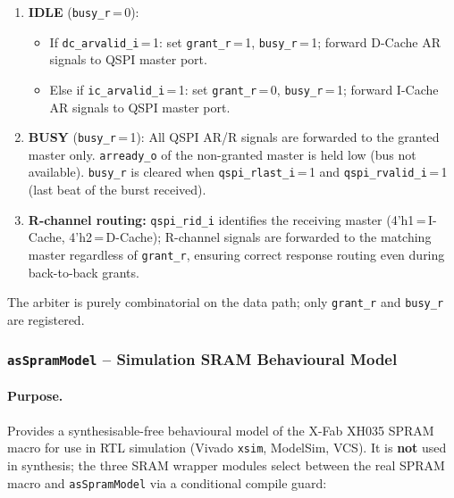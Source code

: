\begin{enumerate}
  \item \textbf{IDLE} (\texttt{busy\_r}\,=\,0):
    \begin{itemize}
      \item If \texttt{dc\_arvalid\_i}\,=\,1:
        set \texttt{grant\_r}\,=\,1, \texttt{busy\_r}\,=\,1;
        forward D-Cache AR signals to QSPI master port.
      \item Else if \texttt{ic\_arvalid\_i}\,=\,1:
        set \texttt{grant\_r}\,=\,0, \texttt{busy\_r}\,=\,1;
        forward I-Cache AR signals to QSPI master port.
    \end{itemize}

  \item \textbf{BUSY} (\texttt{busy\_r}\,=\,1):
    All QSPI AR/R signals are forwarded to the granted master only.
    \texttt{arready\_o} of the non-granted master is held low (bus
    not available).
    \texttt{busy\_r} is cleared when \texttt{qspi\_rlast\_i}\,=\,1
    and \texttt{qspi\_rvalid\_i}\,=\,1
    (last beat of the burst received).

  \item \textbf{R-channel routing:}
    \texttt{qspi\_rid\_i} identifies the receiving master (4'h1\,=\,I-Cache,
    4'h2\,=\,D-Cache); R-channel signals are forwarded to the
    matching master regardless of \texttt{grant\_r}, ensuring correct
    response routing even during back-to-back grants.
\end{enumerate}

The arbiter is purely combinatorial on the data path; only
\texttt{grant\_r} and \texttt{busy\_r} are registered.

\subsubsection{\texttt{asSpramModel} -- Simulation SRAM Behavioural Model}
\label{subsubsec:asSpramModel}

\paragraph{Purpose.}
Provides a synthesisable-free behavioural model of the X-Fab XH035
SPRAM macro for use in RTL simulation (Vivado \texttt{xsim}, ModelSim,
VCS).
It is \textbf{not} used in synthesis; the three SRAM wrapper modules
select between the real SPRAM macro and \texttt{asSpramModel} via a
conditional compile guard:

